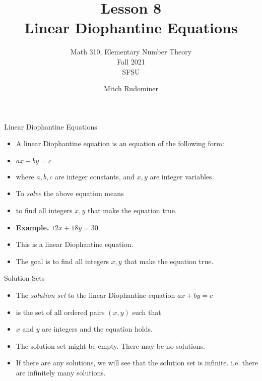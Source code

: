 \documentclass[handout]{beamer}
\title{Lesson 8 \\ Linear Diophantine Equations}
\subtitle{Math 310, Elementary Number Theory \\ Fall 2021 \\ SFSU}
\author{Mitch Rudominer}
\date{}
\begin{document}
\begin{frame}
  \titlepage
\end{frame}

\begin{frame}{Linear Diophantine Equations}

\begin{itemize}
  \item A linear Diophantine equation is an equation of the following form:
  \item $ax + by = c$
  \item where $a,b,c$ are integer constants, and $x,y$ are integer variables.
  \item To \emph{solve} the above equation means
  \item to find all integers $x,y$ that make the equation true.
  \item \textbf{Example.} $12x + 18y = 30$.
  \item This is a linear Diophantine equation.
  \item The goal is to find all integers $x,y$ that make the equation true.
\end{itemize}

\end{frame}


\begin{frame}{Solution Sets}

\begin{itemize}
  \item The \emph{solution set} to the linear Diophantine equation $ax + by = c$
  \item is the set of all ordered pairs $(x,y)$ such that
  \item $x$ and $y$ are integers and the equation holds.
  \item The solution set might be empty. There may be no solutions.
  \item If there are any solutions, we will see that the solution set is infinite. i.e. there are
  infinitely many solutions.
\end{itemize}

\end{frame}

\end{document}
